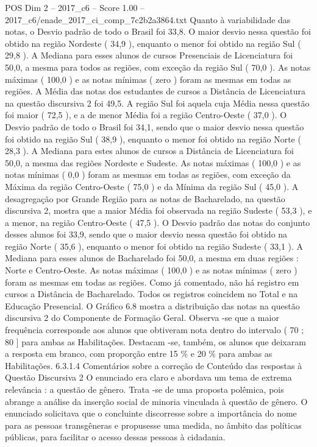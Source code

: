 \begin{textsample}{POS Dim 2 – 2017\_c6 – Score 1.00 – 2017\_c6/enade\_2017\_ci\_comp\_7c2b2a3864.txt}
Quanto à variabilidade das notas, o Desvio padrão de todo o Brasil foi 33,8.
O maior desvio nessa questão foi obtido na região Nordeste ( 34,9 ), enquanto o menor foi obtido na região Sul ( 29,8 ).
A Mediana para esses alunos de cursos Presenciais de Licenciatura foi 50,0, a mesma para todos as regiões, com exceção da região Sul ( 70,0 ).
As notas máximas ( 100,0 ) e as notas mínimas ( zero ) foram as mesmas em todas as regiões.
A Média das notas dos estudantes de cursos a Distância de Licenciatura na questão discursiva 2 foi 49,5.
A região Sul foi aquela cuja Média nessa questão foi maior ( 72,5 ), e a de menor Média foi a região Centro-Oeste ( 37,0 ).
O Desvio padrão de todo o Brasil foi 34,1, sendo que o maior desvio nessa questão foi obtido na região Sul ( 38,9 ), enquanto o menor foi obtido na região Norte ( 28,3 ).
A Mediana para estes alunos de cursos a Distância de Licenciatura foi 50,0, a mesma das regiões Nordeste e Sudeste.
As notas máximas ( 100,0 ) e as notas mínimas ( 0,0 ) foram as mesmas em todas as regiões, com exceção da Máxima da região Centro-Oeste ( 75,0 ) e da Mínima da região Sul ( 45,0 ).
A desagregação por Grande Região para as notas de Bacharelado, na questão discursiva 2, mostra que a maior Média foi observada na região Sudeste ( 53,3 ), e a menor, na região Centro-Oeste ( 47,5 ).
O Desvio padrão das notas do conjunto desses alunos foi 33,9, sendo que o maior desvio nessa questão foi obtido na região Norte ( 35,6 ), enquanto o menor foi obtido na região Sudeste ( 33,1 ).
A Mediana para esses alunos de Bacharelado foi 50,0, a mesma em duas regiões : Norte e Centro-Oeste.
As notas máximas ( 100,0 ) e as notas mínimas ( zero ) foram as mesmas em todas as regiões.
Como já comentado, não há registro em cursos a Distância de Bacharelado.
Todos os registros coincidem no Total e na Educação Presencial.
O Gráfico 6.8 mostra a distribuição das notas na questão discursiva 2 do Componente de Formação Geral.
Observa -se que a maior frequência corresponde aos alunos que obtiveram nota dentro do intervalo ( 70 ; 80 ] para ambas as Habilitações.
Destacam -se, também, os alunos que deixaram a resposta em branco, com proporção entre 15 \% e 20 \% para ambas as Habilitações. 6.3.1.4 Comentários sobre a correção de Conteúdo das respostas à Questão Discursiva 2 O enunciado era claro e abordava um tema de extrema relevância : a questão de gênero.
Trata -se de uma proposta polêmica, pois abrange a análise da inserção social de minoria vinculada à questão de gênero.
O enunciado solicitava que o concluinte discorresse sobre a importância do nome para as pessoas transgêneras e propusesse uma medida, no âmbito das políticas públicas, para facilitar o acesso dessas pessoas à cidadania.

\end{textsample}
